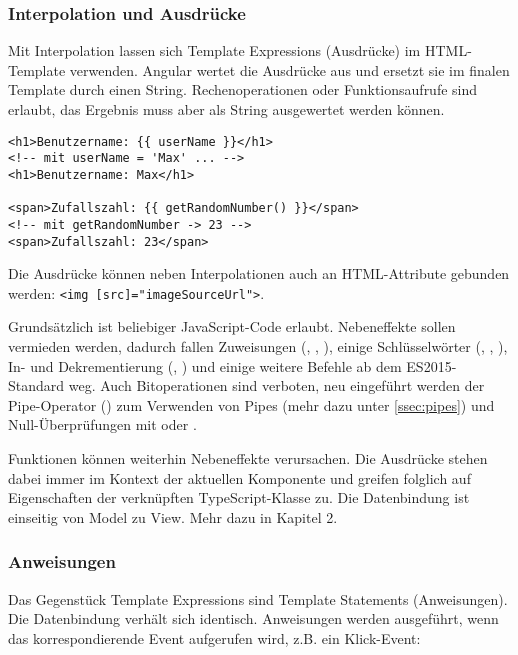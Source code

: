 \subsubsection{Interpolation und Ausdrücke}

Mit Interpolation lassen sich Template Expressions (Ausdrücke) im HTML-Template verwenden. Angular wertet die Ausdrücke aus und ersetzt sie im finalen Template durch einen String. Rechenoperationen oder Funktionsaufrufe sind erlaubt, das Ergebnis muss aber als String ausgewertet werden können.

\begin{listing}
\begin{verbatim}
<h1>Benutzername: {{ userName }}</h1>
<!-- mit userName = 'Max' ... -->
<h1>Benutzername: Max</h1>

<span>Zufallszahl: {{ getRandomNumber() }}</span>
<!-- mit getRandomNumber -> 23 -->
<span>Zufallszahl: 23</span>
\end{verbatim}
\end{listing}

Die Ausdrücke können neben Interpolationen auch an HTML-Attribute gebunden werden: \texttt{<img [src]="imageSourceUrl">}.

Grundsätzlich ist beliebiger JavaScript-Code erlaubt. Nebeneffekte sollen vermieden werden, dadurch fallen Zuweisungen (\inlinecode{=}, \inlinecode{+=}, \inlinecode{-=,}), einige Schlüsselwörter (, , ), In- und Dekrementierung (\inlinecode{++}, \inlinecode{-{}-}) und einige weitere Befehle ab dem ES2015-Standard weg. Auch Bitoperationen sind verboten, neu eingeführt werden der Pipe-Operator (\inlinecode{|}) zum Verwenden von Pipes (mehr dazu unter \ref{ssec:pipes}) und Null-Überprüfungen mit \inlinecode{!} oder .

Funktionen können weiterhin Nebeneffekte verursachen. Die Ausdrücke stehen dabei immer im Kontext der aktuellen Komponente und greifen folglich auf Eigenschaften der verknüpften TypeScript-Klasse zu. Die Datenbindung ist einseitig von Model zu View. Mehr dazu in Kapitel 2.

\subsubsection{Anweisungen}
Das Gegenstück Template Expressions sind Template Statements (Anweisungen). Die Datenbindung verhält sich identisch. Anweisungen werden ausgeführt, wenn das korrespondierende Event aufgerufen wird, z.B. ein Klick-Event: 

